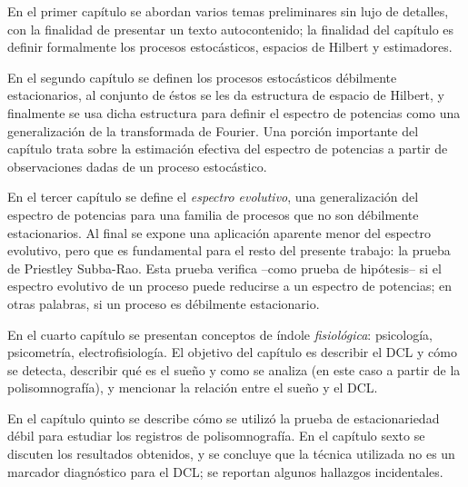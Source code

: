 \documentclass[12pt,letterpaper,draft]{book}
\begin{document}
En el primer capítulo se abordan varios temas preliminares sin lujo de detalles, con la finalidad de presentar un texto autocontenido;
%
la finalidad del capítulo es definir formalmente los procesos estocásticos, espacios de Hilbert y estimadores.

En el segundo capítulo se definen los procesos estocásticos débilmente estacionarios, al conjunto de éstos se les da estructura de espacio de Hilbert, y finalmente se usa dicha estructura para definir el espectro de potencias como una generalización de la transformada de Fourier.
%
Una porción importante del capítulo trata sobre la estimación efectiva del espectro de potencias a partir de observaciones dadas de un proceso estocástico.

En el tercer capítulo se define el \textit{espectro evolutivo}, una generalización del espectro de potencias para una familia de procesos que no son débilmente estacionarios.
%
Al final se expone una aplicación aparente menor del espectro evolutivo, pero que es fundamental para el resto del presente trabajo: la prueba de Priestley Subba-Rao. 
%
Esta prueba verifica --como prueba de hipótesis-- si el espectro evolutivo de un proceso puede reducirse a un espectro de potencias; en otras palabras, si un proceso es débilmente estacionario.

En el cuarto capítulo se presentan conceptos de índole \textit{fisiológica}: psicología, psicometría, electrofisiología.
%
El objetivo del capítulo es describir el DCL y cómo se detecta, describir qué es el sueño y como se analiza (en este caso a partir de la polisomnografía), y mencionar la relación entre el sueño y el DCL.

En el capítulo quinto se describe cómo se utilizó la prueba de estacionariedad débil para estudiar los registros de polisomnografía.
%
En el capítulo sexto se discuten los resultados obtenidos, y se concluye que la técnica utilizada no es un marcador diagnóstico para el DCL; se reportan algunos hallazgos incidentales.
\end{document}
